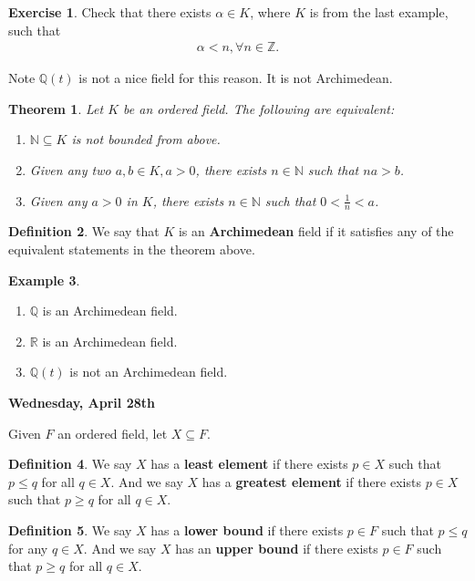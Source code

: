 \documentclass[12pt]{amsbook}
\theoremstyle{plain}
\newtheorem{theorem}{Theorem}[chapter]
\numberwithin{section}{chapter}
\numberwithin{equation}{chapter}
\theoremstyle{definition}
\newtheorem{e}{Exercise}
\newtheorem{Def}[theorem]{Definition}
\newtheorem{Ex}[theorem]{Example}
\theoremstyle{remark}
\theoremstyle{plain}
\newcommand{\sub}{\subseteq}
\newcommand{\R}{\mathbb{R}}
\newcommand{\z}{\mathbb{Z}}
\newcommand{\n}{\mathbb{N}}
\newcommand{\Q}{\mathbb{Q}}
\newcommand{\bee}{\begin{equation}\begin{aligned}}
\newcommand{\eee}{\end{aligned}\end{equation}}
\newcommand{\fracc}{\frac}
\renewcommand{\leq}{\leqslant}
\renewcommand{\geq}{\geqslant}
\begin{document}
\begin{e}
Check that there exists $\alpha \in K$, where $K$ is from the last example, such that 
\bee
\alpha < n, \forall n \in \z.
\eee
\end{e}

Note $\Q(t)$ is not a nice field for this reason. It is not Archimedean. 

\begin{theorem}
Let $K$ be an ordered field. The following are equivalent:
\begin{enumerate}
\item $\n \sub K$ is not bounded from above.
\item Given any two $a,b \in K,a > 0$, there exists $n \in \n$ such that $na > b$.
\item Given any $a > 0$ in $K$, there exists $n \in \n$ such that $0 < \fracc{1}{n} < a$. 
\end{enumerate}
\end{theorem}

\begin{Def}
We say that $K$ is an \textbf{Archimedean} field if it satisfies any of the equivalent statements in the theorem above. 
\end{Def}

\begin{Ex}
\begin{enumerate}
\item $\Q$ is an Archimedean field. 
\item $\R$ is an Archimedean field. 
\item $\Q(t)$ is not an Archimedean field. 
\end{enumerate}

\end{Ex}


\textbf{Wednesday, April 28th}


Given $F$ an ordered field, let $X \sub F$. 

\begin{Def}
We say $X$ has a \textbf{least element} if there exists $p \in X$ such that $p \leq q$ for all $q \in X$. And we say $X$ has a \textbf{greatest element} if there exists $p \in X$ such that $p \geq q$ for all $q \in X$. 
\end{Def}

\begin{Def}
We say $X$ has a \textbf{lower bound} if there exists $p \in F$ such that $p \leq q$ for any $q \in X$. And we say $X$ has an \textbf{upper bound} if there exists $p \in F$ such that $p \geq q$ for all $q \in X$. 
\end{Def}
\end{document}
